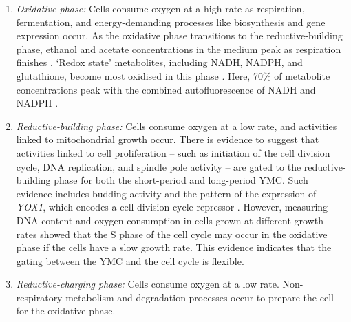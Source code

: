 \begin{enumerate}
  \item \emph{Oxidative phase:} Cells consume oxygen at a high rate as respiration, fermentation, and
        energy-demanding processes
        like biosynthesis and gene expression occur.
    As the oxidative phase transitions to the reductive-building phase, ethanol and acetate concentrations in the medium peak as respiration finishes \citep{tuLogicYeastMetabolic2005}.
    `Redox state' metabolites, including NADH, NADPH, and glutathione, become most oxidised in this phase \citep{lloydUltradianMetronomeTimekeeper2005}.
Here, 70\% of metabolite concentrations peak with the combined autofluorescence of NADH and NADPH \citep{murrayRegulationYeastOscillatory2007}.
\item \emph{Reductive-building phase:} Cells consume oxygen at a low rate, and activities linked to mitochondrial growth occur.
  There is evidence to suggest that activities linked to cell proliferation -- such as initiation of the cell division cycle, DNA replication, and spindle pole activity -- are gated to the reductive-building phase for both the short-period and long-period YMC.
  Such evidence includes budding activity and the pattern of the expression of \emph{YOX1}, which encodes a cell division cycle repressor \citep{tuLogicYeastMetabolic2005}.
  However, measuring DNA content and oxygen consumption in cells grown at different growth rates \citep{slavovCouplingGrowthRate2011} showed that the S phase of the cell cycle may occur in the oxidative phase if the cells have a slow growth rate.
  This evidence indicates that the gating between the YMC and the cell cycle is flexible.
\item \emph{Reductive-charging phase:} Cells consume oxygen at a low rate.
  Non-respiratory metabolism and degradation processes occur to prepare the cell for the oxidative phase.

\end{enumerate}
